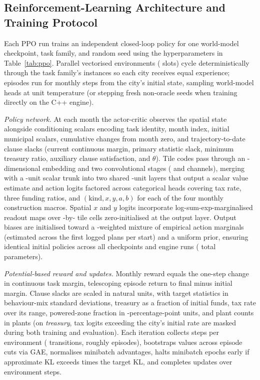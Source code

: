 \subsection{Reinforcement-Learning Architecture and Training Protocol}\label{app:rl}

Each PPO run trains an independent closed-loop policy for one world-model checkpoint, task family, and random seed using the hyperparameters in Table~\ref{tab:ppo}. Parallel vectorised environments (\PrEnvs{} slots) cycle deterministically through the task family's instances so each city receives equal experience; episodes run for \Horizon{} monthly steps from the city's initial state, sampling world-model heads at unit temperature (or stepping fresh non-oracle seeds when training directly on the C++ engine).

\emph{Policy network.} At each month the actor-critic observes the spatial state alongside \PrEnvFeatures{} conditioning scalars encoding task identity, month index, initial municipal scalars, cumulative changes from month zero, and trajectory-to-date clause slacks (current continuous margin, primary statistic slack, minimum treasury ratio, auxiliary clause satisfaction, and $\theta$). Tile codes pass through an \PrTileEmb-dimensional embedding and two convolutional stages (\PrConvA{} and \PrConvB{} channels), merging with a \PrHidden-unit scalar trunk into two shared \PrHidden-unit layers that output a scalar value estimate and \PrLogits{} action logits factored across \PrHeads{} categorical heads covering tax rate, three funding ratios, and $(\text{kind}, x, y, a, b)$ for each of the four monthly construction macros. Spatial $x$ and $y$ logits incorporate log-sum-exp-marginalised readout maps over \PrReadCell{}-by-\PrReadCell{} tile cells zero-initialised at the output layer. Output biases are initialised toward a \PrInitMix{}-weighted mixture of empirical action marginals (estimated across the first \PrInitPlans{} logged plans per start) and a uniform prior, ensuring identical initial policies across all checkpoints and engine runs (\PrPolicyParams{} total parameters).

\emph{Potential-based reward and updates.} Monthly reward equals the one-step change in continuous task margin, telescoping episode return to final minus initial margin. Clause slacks are scaled in natural units, with target statistics in behaviour-mix standard deviations, treasury as a fraction of initial funds, tax rate over its range, powered-zone fraction in \PrPowerUnit{}-percentage-point units, and plant counts in plants (on \emph{treasury}, tax logits exceeding the city's initial rate are masked during both training and evaluation). Each iteration collects \PrRollout{} steps per environment (\PrMonthsPerUpdate{} transitions, roughly \PrEpisodesPerUpdate{} episodes), bootstraps values across episode cuts via GAE, normalises minibatch advantages, halts minibatch epochs early if approximate KL exceeds \PrKlStop{} times the target KL, and completes \PrUpdates{} updates over \PrBudget{} environment steps.

